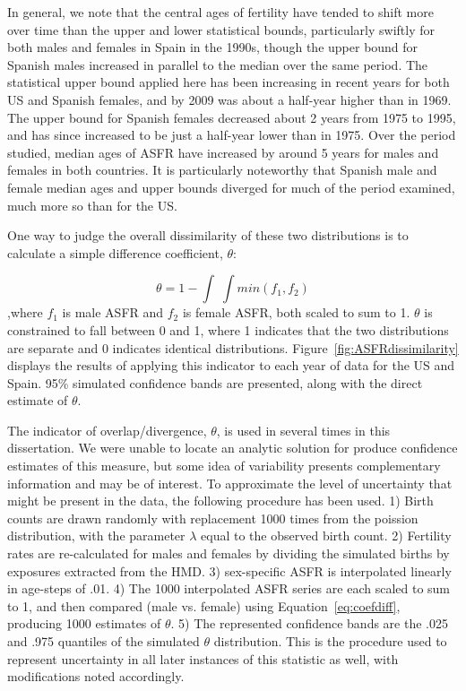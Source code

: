 In general, we note that the central ages of fertility have tended to shift more
over time than the upper and lower statistical bounds, particularly swiftly for
both males and females in Spain in the 1990s, though the upper bound for
Spanish males increased in parallel to the median over the same period. The
statistical upper bound applied here has been increasing in recent years for
both US and Spanish females, and by 2009 was about a half-year higher than in
1969. The upper bound for Spanish females decreased about 2 years from 1975
to 1995, and has since increased to be just a half-year lower than in 1975. Over
the period studied, median ages of ASFR have increased by around 5 years for
males and females in both countries. It is particularly noteworthy that Spanish
male and female median ages and upper bounds diverged for much of the period
examined, much more so than for the US.

One way to judge the overall dissimilarity of these two distributions is to
calculate a simple difference coefficient, $\theta$:

\begin{equation}
\label{eq:coefdiff}
\theta = 1 - \int \;\int min(f_1, f_2)
\end{equation}
,where $f_1$ is male ASFR and $f_2$ is female ASFR, both scaled to sum
to 1. $\theta$ is constrained to fall between 0 and 1, where 1 indicates that the
two distributions are separate and 0 indicates identical distributions.
Figure~\ref{fig:ASFRdissimilarity} displays the results of applying this
indicator to each year of data for the US and Spain. 95\% simulated confidence
bands are presented, along with the direct estimate of
$\theta$. 

The indicator of overlap/divergence, $\theta$, is
used in several times in this dissertation. We were unable to locate
an analytic solution for produce confidence estimates of this measure, but
some idea of variability presents complementary information and may be of
interest. To approximate the level of uncertainty that might be present in the
data, the following procedure has been used. 1) Birth counts are drawn randomly
with replacement 1000 times from the poission distribution, with the parameter
$\lambda$ equal to the observed birth count. 2) Fertility rates are
re-calculated for males and females by dividing the simulated births by
exposures extracted from the HMD. 3) sex-specific ASFR is interpolated linearly
in age-steps of .01. 4) The 1000 interpolated ASFR series are each scaled to sum
to 1, and then compared (male vs. female) using Equation~\ref{eq:coefdiff},
producing 1000 estimates of $\theta$. 5) The represented confidence bands are the .025 and .975 quantiles
of the simulated $\theta$ distribution. This is the procedure used to represent
uncertainty in all later instances of this statistic as well, with
modifications noted accordingly. 

